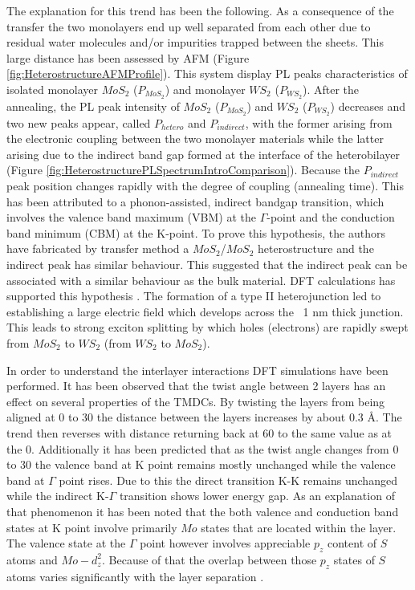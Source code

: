 The explanation for this trend has been the following. As a consequence of the transfer the two monolayers end up well separated from each other due to residual water molecules and/or impurities trapped between the sheets. This large distance has been assessed by AFM (Figure \ref{fig:HeterostructureAFMProfile}). This system display PL peaks characteristics of isolated monolayer $MoS_2$ ($P_{MoS_2}$) and monolayer $WS_2$ ($P_{WS_2}$). After the annealing, the PL peak intensity of $MoS_2$ ($P_{MoS_2}$) and $WS_2$ ($P_{WS_2}$) decreases and two new peaks appear, called $P_{hetero}$ and $P_{indirect}$, with the former arising from the electronic coupling between the two monolayer materials while the latter arising due to the indirect band gap formed at the interface of the heterobilayer (Figure \ref{fig:HeterostructurePLSpectrumIntroComparison}). Because the $P_{indirect}$ peak position changes rapidly with the degree of coupling (annealing time). This has been attributed to a phonon-assisted, indirect bandgap transition, which involves the valence band maximum (VBM) at the {$\Gamma$}-point and the conduction band minimum (CBM) at the K-point. To prove this hypothesis, the authors have fabricated by transfer method a $MoS_2$/$MoS_2$ heterostructure and the indirect peak has similar behaviour. This suggested that the indirect peak can be associated with a similar behaviour as the bulk material. DFT calculations has supported this hypothesis \cite{Zande2014}. The formation of a type II heterojunction led to establishing a large electric field which develops across the ~1 nm thick junction. This leads to strong exciton splitting by which holes (electrons) are rapidly swept from $MoS_2$ to $WS_2$ (from $WS_2$  to $MoS_2$).

In order to understand the interlayer interactions DFT simulations have been performed. It has been observed that the twist angle between 2 layers has an effect on several properties of the TMDCs. By twisting the layers from being aligned at 0{\degree} to 30{\degree} the distance between the layers increases by about 0.3 \r{A}. The trend then reverses with distance returning back at 60 {\degree} to the same value as at the 0{\degree}. Additionally it has been predicted that as the twist angle changes from 0{\degree} to 30{\degree} the valence band at K point remains mostly unchanged while the valence band at $\Gamma$ point rises. Due to this the direct transition K-K remains unchanged while the indirect K-$\Gamma$ transition shows lower energy gap. As an explanation of that phenomenon it has been noted that the both valence and conduction band states at K point involve primarily $Mo$ states that are located within the layer. The valence state at the $\Gamma$ point however involves appreciable $p_z$ content of $S$ atoms and $Mo-d_z^2$. Because of that the overlap between those $p_z$ states of $S$ atoms varies significantly with the layer separation \cite{Nayak2017}.

